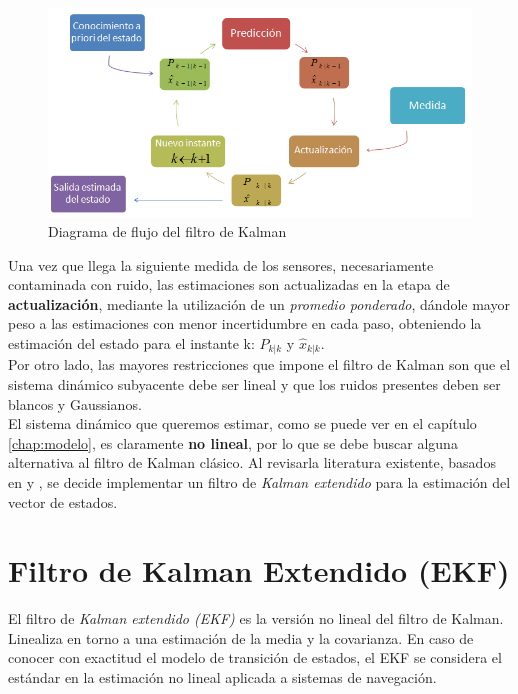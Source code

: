 \documentclass[main]{subfiles}
\begin{document}
\begin{figure}[h!]
	\centering
	\includegraphics[width=.8\textwidth]{./pics_kalman/kal.png}
	\caption{Diagrama de flujo del filtro de Kalman}
	\label{fig:kal}
\end{figure}

Una vez que llega la siguiente medida de los sensores, necesariamente contaminada con ruido, las estimaciones son actualizadas en la etapa de \textbf{actualización}, mediante la utilización de un \emph{promedio ponderado}, dándole mayor peso a las estimaciones con menor incertidumbre en cada paso, obteniendo la estimación del estado para el instante k: $P_{k|k}$ y $\hat{x}_{k|k}$.\\

Por otro lado, las mayores restricciones que impone el filtro de Kalman son que el sistema dinámico subyacente debe ser lineal y que los ruidos presentes deben ser blancos y Gaussianos.\\

El sistema dinámico que queremos estimar, como se puede ver en el capítulo \ref{chap:modelo}, es claramente \textbf{no lineal}, por lo que se debe buscar alguna alternativa al filtro de Kalman clásico. Al revisarla literatura existente, basados en \cite{bib:kalman} y \cite{bib:kalman2}, se decide implementar un filtro de \emph{Kalman extendido} para la estimación del vector de estados.

\section{Filtro de Kalman Extendido (EKF)}

El filtro de \emph{Kalman extendido (EKF)} es la versión no lineal del filtro de Kalman. Linealiza en torno a una estimación de la media y la covarianza. En caso de conocer con exactitud el modelo de transición de estados, el EKF se considera el estándar en la estimación no lineal aplicada a sistemas de navegación.\\
\end{document}
